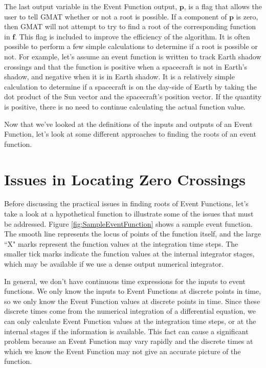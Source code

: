 The last output variable in the Event Function output, $\mathbf{p}$,
is a flag that allows the user to tell GMAT whether or not a root is
possible.  If a component of $\mathbf{p}$ is zero, then GMAT will
not attempt to try to find a root of the corresponding function in
$\mathbf{f}$.  This flag is included to improve the efficiency of
the algorithm. It is often possible to perform a few simple
calculations to determine if a root is possible or not. For example,
let's assume an event function is written to track Earth shadow
crossings and that the function is positive when a spacecraft is not
in Earth's shadow, and negative when it is in Earth shadow.  It is a
relatively simple calculation to determine if a spacecraft is on the
day-side of Earth by taking the dot product of the Sun vector and
the spacecraft's position vector. If the quantity is positive, there
is no need to continue calculating the actual function value.

Now that we've looked at the definitions of the inputs and outputs
of an Event Function, let's look at some different approaches to
finding the roots of an event function.


\section{Issues in Locating Zero Crossings}

Before discussing the practical issues in finding roots of Event
Functions, let's take a look at a hypothetical function to
illustrate some of the issues that must be addressed. Figure
\ref{fig:SampleEventFunction} shows a sample event function.  The
smooth line represents the locus of points of the function itself,
and the large ``X" marks represent the function values at the
integration time steps.  The smaller tick marks indicate the
function values at the internal integrator stages, which may be
available if we use a dense output numerical integrator.

In general, we don't have continuous time expressions for the inputs
to event functions.  We only know the inputs to Event Functions at
discrete points in time, so we only know the Event Function values
at discrete points in time.  Since these discrete times come from
the numerical integration of a differential equation, we can only
calculate Event Function values at the integration time steps, or at
the internal stages if the information is available.  This fact can
cause a significant problem because an Event Function may vary
rapidly and the discrete times at which we know the Event Function
may not give an accurate picture of the function.

